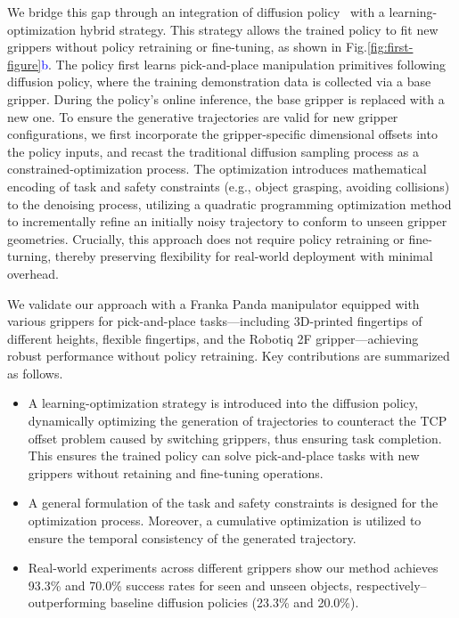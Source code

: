 We bridge this gap through an integration of diffusion policy~\cite{chi2023diffusion,Ze2024DP3} with a learning-optimization hybrid strategy. This strategy allows the trained policy to fit new grippers without policy retraining or fine-tuning, as shown in Fig.\ref{fig:first-figure}\textcolor{blue}{b}. The policy first learns pick-and-place manipulation primitives following diffusion policy, where the training demonstration data is collected via a base gripper. During the policy's online inference, the base gripper is replaced with a new one. To ensure the generative trajectories are valid for new gripper configurations, we first incorporate the gripper-specific dimensional offsets into the policy inputs, and recast the traditional diffusion sampling process as a constrained-optimization process. The optimization introduces mathematical encoding of task and safety constraints (e.g.,  object grasping, avoiding collisions) to the denoising process, utilizing a quadratic programming optimization method to incrementally refine an initially noisy trajectory to conform to unseen gripper geometries. Crucially, this approach does not require policy retraining or fine-turning, thereby preserving flexibility for real-world deployment with minimal overhead.

We validate our approach with a Franka Panda manipulator equipped with various grippers for pick-and-place tasks—including 3D-printed fingertips of different heights, flexible fingertips, and the Robotiq 2F gripper—achieving robust performance without policy retraining. Key contributions are summarized as follows.
\begin{itemize}
    \item A learning-optimization strategy is introduced into the diffusion policy, dynamically optimizing the generation of trajectories to counteract the TCP offset problem caused by switching grippers, thus ensuring task completion. This ensures the trained policy can solve pick-and-place tasks with new grippers without retaining and fine-tuning operations.
    \item A general formulation of the task and safety constraints is designed for the optimization process. Moreover, a cumulative optimization is utilized to ensure the temporal consistency of the generated trajectory.
    \item Real-world experiments across different grippers show our method achieves 93.3\% and 70.0\% success rates for seen and unseen objects, respectively--outperforming baseline diffusion policies (23.3\% and 20.0\%).
\end{itemize} 

